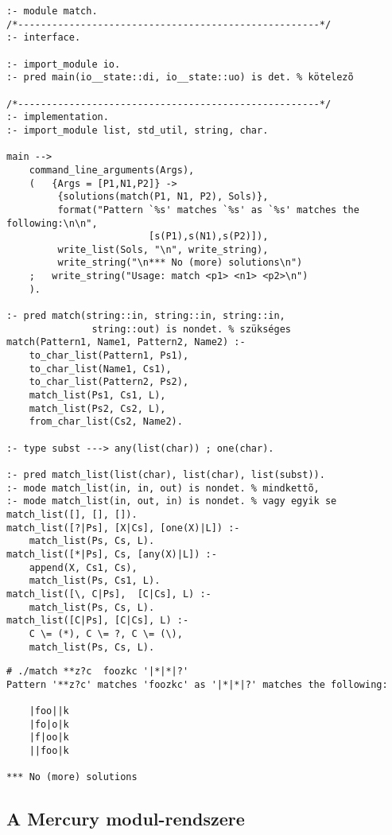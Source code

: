 \begin{verbatim}
:- module match.
/*-----------------------------------------------------*/
:- interface.

:- import_module io.
:- pred main(io__state::di, io__state::uo) is det. % kötelezõ

/*-----------------------------------------------------*/
:- implementation.
:- import_module list, std_util, string, char.

main --> 
    command_line_arguments(Args),
    (   {Args = [P1,N1,P2]} ->
         {solutions(match(P1, N1, P2), Sols)},
         format("Pattern `%s' matches `%s' as `%s' matches the following:\n\n",
                         [s(P1),s(N1),s(P2)]),
         write_list(Sols, "\n", write_string),
         write_string("\n*** No (more) solutions\n")
    ;   write_string("Usage: match <p1> <n1> <p2>\n")
    ).

:- pred match(string::in, string::in, string::in,
               string::out) is nondet. % szükséges
match(Pattern1, Name1, Pattern2, Name2) :-
    to_char_list(Pattern1, Ps1),
    to_char_list(Name1, Cs1),
    to_char_list(Pattern2, Ps2),
    match_list(Ps1, Cs1, L),
    match_list(Ps2, Cs2, L),
    from_char_list(Cs2, Name2).

:- type subst ---> any(list(char)) ; one(char).

:- pred match_list(list(char), list(char), list(subst)).
:- mode match_list(in, in, out) is nondet. % mindkettõ,
:- mode match_list(in, out, in) is nondet. % vagy egyik se
match_list([], [], []).
match_list([?|Ps], [X|Cs], [one(X)|L]) :-
    match_list(Ps, Cs, L).
match_list([*|Ps], Cs, [any(X)|L]) :-
    append(X, Cs1, Cs),
    match_list(Ps, Cs1, L).
match_list([\, C|Ps],  [C|Cs], L) :-
    match_list(Ps, Cs, L).
match_list([C|Ps], [C|Cs], L) :-
    C \= (*), C \= ?, C \= (\), 
    match_list(Ps, Cs, L).
\end{verbatim}

\begin{verbatim}
# ./match **z?c  foozkc '|*|*|?'
Pattern '**z?c' matches 'foozkc' as '|*|*|?' matches the following:

    |foo||k
    |fo|o|k
    |f|oo|k
    ||foo|k

*** No (more) solutions
\end{verbatim}

\subsection{A Mercury modul-rendszere}

